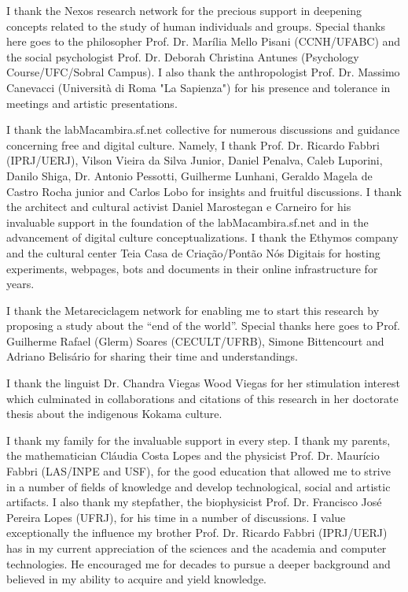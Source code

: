 \documentclass[
12pt,		%
openright,	%
twoside,  %
a4paper,			%
chapter=TITLE,		%
english,			%
french,				%
spanish,			%
brazil				%
]{USPSC}
\begin{document}
\begin{agradecimentos}
I thank the Nexos research network for the precious support in deepening concepts related
to the study of human individuals and groups.
Special thanks here goes to the philosopher Prof. Dr. Marília Mello Pisani (CCNH/UFABC) and the social psychologist 
	Prof. Dr. Deborah Christina Antunes (Psychology Course/UFC/Sobral Campus).
I also thank the anthropologist Prof. Dr. Massimo Canevacci (Università di Roma "La Sapienza")
for his presence and tolerance in meetings and artistic presentations.

I thank the labMacambira.sf.net collective for numerous discussions and guidance
concerning free and digital culture.
Namely, I thank Prof. Dr. Ricardo Fabbri (IPRJ/UERJ), Vilson Vieira da Silva Junior, Daniel Penalva, Caleb Luporini, Danilo Shiga,
Dr. Antonio Pessotti, Guilherme Lunhani, Geraldo Magela de Castro Rocha junior and Carlos Lobo for insights and fruitful discussions.
I thank the architect and cultural activist Daniel Marostegan e Carneiro for his invaluable support in
the foundation of the labMacambira.sf.net and in the advancement of digital culture conceptualizations.
I thank the Ethymos company and the cultural center Teia Casa de Criação/Pontão Nós Digitais for hosting experiments, webpages, bots and documents in their online infrastructure for years.

I thank the Metareciclagem network for enabling me to start this research by proposing
a study about the ``end of the world''.
	Special thanks here goes to Prof. Guilherme Rafael (Glerm) Soares (CECULT/UFRB), Simone Bittencourt and Adriano Belisário
for sharing their time and understandings.

I thank the linguist Dr. Chandra Viegas Wood Viegas for her stimulation interest
which culminated in collaborations and citations of this research in her doctorate thesis
	about the indigenous Kokama culture.

I thank my family for the invaluable support in every step.
I thank my parents, the mathematician Cláudia Costa Lopes and the
	physicist Prof. Dr. Maurício Fabbri (LAS/INPE and USF), for the good education that
allowed me to strive in a number of fields of knowledge 
and develop technological, social and artistic artifacts.
I also thank my stepfather, the biophysicist Prof. Dr. Francisco José Pereira Lopes (UFRJ),
for his time in a number of discussions.
I value exceptionally the influence my brother Prof. Dr. Ricardo Fabbri (IPRJ/UERJ)
has in my current appreciation
of the sciences and the academia and computer technologies.
He encouraged me for decades to pursue a deeper background and believed in my ability to acquire and yield knowledge.


\end{agradecimentos}
\end{document}

